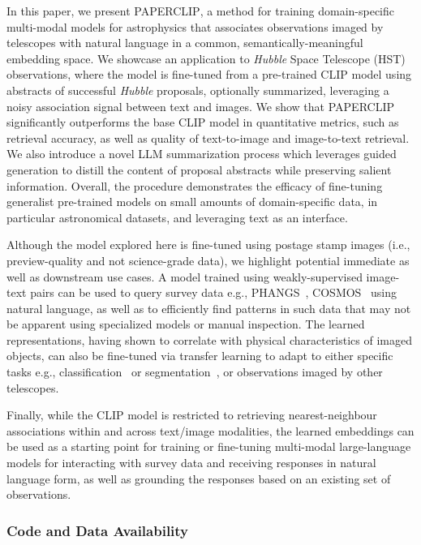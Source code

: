 \documentclass[10pt]{article} %
\newcommand{\hubble}{\emph{Hubble}\xspace}
\begin{document}
In this paper, we present \textsc{PAPERCLIP}, a method for training domain-specific multi-modal models for astrophysics that associates observations imaged by telescopes with natural language in a common, semantically-meaningful embedding space.
%
We showcase an application to \hubble Space Telescope (HST) observations, where the model is fine-tuned from a pre-trained CLIP model using abstracts of successful \hubble proposals, optionally summarized, leveraging a noisy association signal between text and images.
%
We show that \textsc{PAPERCLIP} significantly outperforms the base CLIP model in quantitative metrics, such as retrieval accuracy, as well as quality of text-to-image and image-to-text retrieval.
%
We also introduce a novel LLM summarization process which leverages guided generation to distill the content of proposal abstracts while preserving salient information. 
%
Overall, the procedure demonstrates the efficacy of fine-tuning generalist pre-trained models on small amounts of domain-specific data, in particular astronomical datasets, and leveraging text as an interface.

Although the model explored here is fine-tuned using postage stamp images (i.e., preview-quality and not science-grade data), we highlight potential immediate as well as downstream use cases.
%
A model trained using weakly-supervised image-text pairs can be used to query survey data e.g., PHANGS~\citep{lee2022phangs}, COSMOS~\citep{scoville2007cosmic} using natural language, as well as to efficiently find patterns in such data that may not be apparent using specialized models or manual inspection.
%
The learned representations, having shown to correlate with physical characteristics of imaged objects, can also be fine-tuned via transfer learning to adapt to either specific tasks e.g., classification~\citep{wei2020deep} or segmentation~\citep{hausen2020morpheus}, or observations imaged by other telescopes.
%

Finally, while the CLIP model is restricted to retrieving nearest-neighbour associations within and across text/image modalities, the learned embeddings can be used as a starting point for training or fine-tuning multi-modal large-language models for interacting with survey data and receiving responses in natural language form, as well as grounding the responses based on an existing set of observations.

\subsubsection*{Code and Data Availability}
\end{document}
